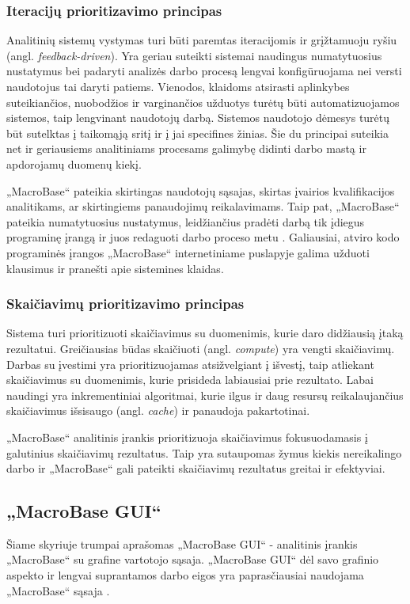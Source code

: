 \documentclass{VUMIFPSkursinis}
\begin{document}
\subsubsection{Iteracijų prioritizavimo principas}
Analitinių sistemų vystymas turi būti paremtas iteracijomis ir grįžtamuoju ryšiu (angl. \textit{feedback-driven}). Yra geriau  suteikti sistemai naudingus numatytuosius nustatymus bei padaryti analizės darbo procesą lengvai konfigūruojama nei versti naudotojus tai daryti patiems. Vienodos, klaidoms atsirasti aplinkybes suteikiančios, nuobodžios ir varginančios užduotys turėtų būti automatizuojamos sistemos, taip lengvinant naudotojų darbą. Sistemos naudotojo dėmesys turėtų būt sutelktas į taikomąją sritį ir į jai specifines žinias. Šie du principai suteikia net ir geriausiems analitiniams procesams galimybę didinti darbo mastą ir apdorojamų duomenų kiekį.\par

„MacroBase“ pateikia skirtingas naudotojų sąsajas, skirtas įvairios kvalifikacijos analitikams, ar skirtingiems panaudojimų reikalavimams. Taip pat, „MacroBase“ pateikia numatytuosius nustatymus, leidžiančius pradėti darbą tik įdiegus programinę įrangą ir juos redaguoti darbo proceso metu \cite{prioritizing_attention}. Galiausiai, atviro kodo programinės įrangos „MacroBase“ internetiniame puslapyje galima užduoti klausimus ir pranešti apie sistemines klaidas.

\subsubsection{Skaičiavimų prioritizavimo principas}
Sistema turi prioritizuoti skaičiavimus su duomenimis, kurie daro didžiausią įtaką rezultatui. Greičiausias būdas skaičiuoti (angl. \textit{compute}) yra vengti skaičiavimų. Darbas su įvestimi yra prioritizuojamas atsižvelgiant į išvestį, taip atliekant skaičiavimus su duomenimis, kurie prisideda labiausiai prie rezultato. Labai naudingi yra inkrementiniai algoritmai, kurie ilgus ir daug resursų reikalaujančius skaičiavimus išsisaugo (angl. \textit{cache}) ir panaudoja pakartotinai.\par

„MacroBase“ analitinis įrankis prioritizuoja skaičiavimus fokusuodamasis į galutinius skaičiavimų rezultatus. Taip yra sutaupomas žymus kiekis nereikalingo darbo \cite{prioritizing_attention} ir „MacroBase“ gali pateikti skaičiavimų rezultatus greitai ir efektyviai.

\subsection{„MacroBase GUI“} \label{subsec:macrobase_gui}
Šiame skyriuje trumpai aprašomas „MacroBase GUI“ - analitinis įrankis „MacroBase“ su grafine vartotojo sąsaja. „MacroBase GUI“ dėl savo grafinio aspekto ir lengvai suprantamos darbo eigos yra paprasčiausiai naudojama „MacroBase“ sąsaja \cite{macrobase_overview, prioritizing_attention}.\par
\end{document}
